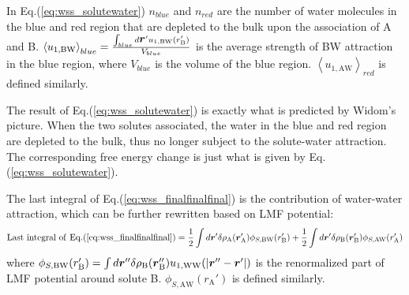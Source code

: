 \documentclass[9pt]{article}
\renewcommand{\vec}[1]{\mbox{\boldmath$#1$}}
\newcommand{\A}{\mathrm{A}}
\newcommand{\W}{\mathrm{W}}
\newcommand{\B}{\mathrm{B}}
\begin{document}
In Eq.(\ref{eq:wss_solutewater}) $n_{blue}$ and $n_{red}$ are the number of water molecules in the blue and red region that are depleted to the bulk upon the association of A and B. $\left\langle u_{1,\B\W} \right\rangle_{blue} = \frac{\int_{blue}d \vec{r}' u_{1,\B\W}(r_{\B}')}{V_{blue}} $ is the average strength of BW attraction in the blue region, where $V_{blue}$ is the volume of the blue region. $\left\langle u_{1,\A\W} \right\rangle_{red}$ is defined similarly.

The result of Eq.(\ref{eq:wss_solutewater}) is exactly what is predicted by Widom's picture. When the two solutes associated, the water in the blue and red region are depleted to the bulk, thus no longer subject to the solute-water attraction. The corresponding free energy change is just what is given by Eq.(\ref{eq:wss_solutewater}). 

The last integral of Eq.(\ref{eq:wss_finalfinalfinal}) is the contribution of water-water attraction, which can be further rewritten based on LMF potential:
\begin{equation}
\mathrm{Last\,\, integral\,\, of\,\, Eq.(\ref{eq:wss_finalfinalfinal})} = \frac{1}{2}\int d \vec{r}'\delta \rho_{\A}(\vec{r}_{\A}') \phi_{S, \B\W}(r_{\B}') +  \frac{1}{2} \int d \vec{r}'\delta \rho_{\B}(\vec{r}_{\B}') \phi_{S,\A\W}(r_{\A}')
\label{eq:wss_ww}
\end{equation}
where $\phi_{S, \B\W}(r_{\B}') = \int d\vec{r}'' \delta \rho_{ \B}(\vec{r}_{\B}'')u_{1,\W\W}(|\vec{r}'' - \vec{r}'|) $ is the renormalized part of LMF potential around solute B. $\phi_{S,\A\W}(r_{\A}')$ is defined similarly.
\end{document}
